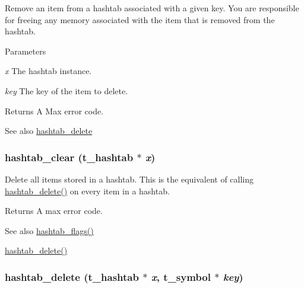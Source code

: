 Remove an item from a hashtab associated with a given key. You are responsible for freeing any memory associated with the item that is removed from the hashtab.


\begin{DoxyParams}{Parameters}
\item[{\em x}]The hashtab instance. \item[{\em key}]The key of the item to delete. \end{DoxyParams}
\begin{DoxyReturn}{Returns}
A Max error code.
\end{DoxyReturn}
\begin{DoxySeeAlso}{See also}
\hyperlink{group__hashtab_gadc3b33bd84f054f9a725b87e809779fc}{hashtab\_\-delete} 
\end{DoxySeeAlso}
\hypertarget{group__hashtab_gae7984db2865416d6da6ce20c76975321}{
\subsubsection[{hashtab\_\-clear}]{ hashtab\_\-clear ({\bf t\_\-hashtab} $\ast$ {\em x})}}
\label{group__hashtab_gae7984db2865416d6da6ce20c76975321}


Delete all items stored in a hashtab. This is the equivalent of calling \hyperlink{group__hashtab_gadc3b33bd84f054f9a725b87e809779fc}{hashtab\_\-delete()} on every item in a hashtab.

\begin{DoxyReturn}{Returns}
A max error code. 
\end{DoxyReturn}
\begin{DoxySeeAlso}{See also}
\hyperlink{group__hashtab_gaaaefb350afdfdbe1440dd6401ac56eb7}{hashtab\_\-flags()} 

\hyperlink{group__hashtab_gadc3b33bd84f054f9a725b87e809779fc}{hashtab\_\-delete()} 
\end{DoxySeeAlso}
\hypertarget{group__hashtab_gadc3b33bd84f054f9a725b87e809779fc}{
\subsubsection[{hashtab\_\-delete}]{ hashtab\_\-delete ({\bf t\_\-hashtab} $\ast$ {\em x}, \/  {\bf t\_\-symbol} $\ast$ {\em key})}}
\label{group__hashtab_gadc3b33bd84f054f9a725b87e809779fc}



